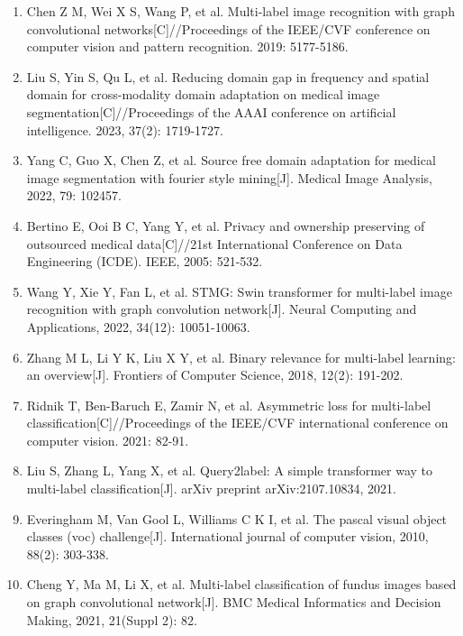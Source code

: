 \begin{enumerate}
\item
  \protect{}\label{_Ref213949382}{}Chen Z M, Wei X S, Wang P, et al. Multi-label image recognition with graph convolutional networks{[}C{]}//Proceedings of the IEEE/CVF conference on computer vision and pattern recognition. 2019: 5177-5186.
\item
  \protect{}\label{_Ref213949348}{}Liu S, Yin S, Qu L, et al. Reducing domain gap in frequency and spatial domain for cross-modality domain adaptation on medical image segmentation{[}C{]}//Proceedings of the AAAI conference on artificial intelligence. 2023, 37(2): 1719-1727.
\item
  \protect{}\label{_Ref213949354}{}Yang C, Guo X, Chen Z, et al. Source free domain adaptation for medical image segmentation with fourier style mining{[}J{]}. Medical Image Analysis, 2022, 79: 102457.
\item
  \protect{}\label{_Ref213949393}{}Bertino E, Ooi B C, Yang Y, et al. Privacy and ownership preserving of outsourced medical data{[}C{]}//21st International Conference on Data Engineering (ICDE). IEEE, 2005: 521-532.
\item
  \protect{}\label{_Ref213949872}{}Wang Y, Xie Y, Fan L, et al. STMG: Swin transformer for multi-label image recognition with graph convolution network{[}J{]}. Neural Computing and Applications, 2022, 34(12): 10051-10063.
\item
  \protect{}\label{_Ref213949896}{}Zhang M L, Li Y K, Liu X Y, et al. Binary relevance for multi-label learning: an overview{[}J{]}. Frontiers of Computer Science, 2018, 12(2): 191-202.
\item
  \protect{}\label{_Ref213949927}{}Ridnik T, Ben-Baruch E, Zamir N, et al. Asymmetric loss for multi-label classification{[}C{]}//Proceedings of the IEEE/CVF international conference on computer vision. 2021: 82-91.
\item
  \protect{}\label{_Ref213950246}{}Liu S, Zhang L, Yang X, et al. Query2label: A simple transformer way to multi-label classification{[}J{]}. arXiv preprint arXiv:2107.10834, 2021.
\item
  \protect{}\label{_Ref213950282}{}Everingham M, Van Gool L, Williams C K I, et al. The pascal visual object classes (voc) challenge{[}J{]}. International journal of computer vision, 2010, 88(2): 303-338.
\item
  \protect{}\label{_Ref213950349}{}Cheng Y, Ma M, Li X, et al. Multi-label classification of fundus images based on graph convolutional network{[}J{]}. BMC Medical Informatics and Decision Making, 2021, 21(Suppl 2): 82.

\end{enumerate}
